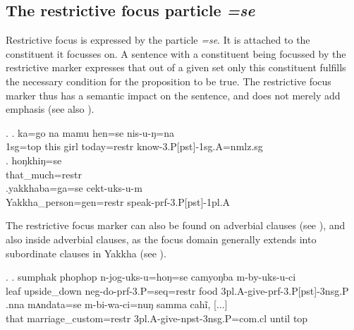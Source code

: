 \subsection{The restrictive focus particle \emph{=se}}
		
Restrictive focus is expressed by the particle \emph{=se}. It is attached to the constituent it focusses on. A sentence with a constituent being focussed by the restrictive marker  expresses that out of a given  set only this constituent fulfills the necessary condition for the proposition to be true. The restrictive focus marker thus has a semantic impact on the sentence, and does not merely add emphasis (see also \citet{Koenig1993_Focus}). 

\ex. \ag. ka=go na mamu hen=se nis-u-ŋ=na\\
	 	{\sc 1sg=top} this girl today{\sc=restr} know{\sc -3.P[pst]-1sg.A=nmlz.sg}\\
	 	\bg.  hoŋkhiŋ=se\\
	 	that\_much{\sc=restr}\\
		\bg.yakkhaba=ga=se       cekt-uks-u-m\\
		Yakkha\_person{\sc =gen=restr} speak{\sc -prf-3.P[pst]-1pl.A}\\
		 
		

The restrictive focus  marker can also be found on adverbial clauses (see \Next[a]), and also inside adverbial clauses, as the focus domain generally extends into subordinate clauses in Yakkha (see \Next[b]).

 \ex. \ag. sumphak phophop     n-jog-uks-u=hoŋ=se                             camyoŋba m-by-uks-u-ci\\
 leaf upside\_down {\sc neg-}do{\sc -prf-3.P=seq=restr} food {\sc 3pl.A-}give{\sc -prf-3.P[pst]-3nsg.P}\\
 \bg.nna  mʌndata=se                     m-bi-wa-ci=nuŋ                    samma cahĩ,  [...]\\
 that marriage\_custom{\sc =restr} {\sc 3pl.A-}give{\sc -npst-3nsg.P=com.cl} until {\sc top}\\
   
 
